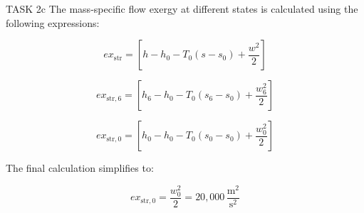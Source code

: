 TASK 2c  
The mass-specific flow exergy at different states is calculated using the following expressions:

\[
ex_{\text{str}} = \left[ h - h_0 - T_0 (s - s_0) + \frac{w^2}{2} \right]
\]

\[
ex_{\text{str},6} = \left[ h_6 - h_0 - T_0 (s_6 - s_0) + \frac{w_6^2}{2} \right]
\]

\[
ex_{\text{str},0} = \left[ h_0 - h_0 - T_0 (s_0 - s_0) + \frac{w_0^2}{2} \right]
\]

The final calculation simplifies to:

\[
ex_{\text{str},0} = \frac{w_0^2}{2} = 20,000 \, \frac{\text{m}^2}{\text{s}^2}
\]